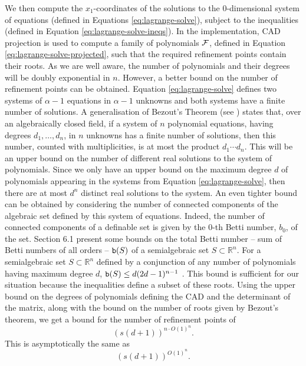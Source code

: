 \documentclass[
]{book}
\theoremstyle{definition}
\theoremstyle{definition}
\theoremstyle{definition}
\theoremstyle{definition}
\theoremstyle{remark}
\begin{document}
We then compute the \(x_1\)-coordinates of the solutions to the \(0\)-dimensional system of equations (defined in Equations \eqref{eq:lagrange-solve}), subject to the inequalities (defined in Equation \eqref{eq:lagrange-solve-ineqs}). In the implementation, CAD projection is used to compute a family of polynomials \({\cal F}\), defined in Equation \eqref{eq:lagrange-solve-projected}, such that the required refinement points contain their roots.
As we are well aware, the number of polynomials and their degrees will be doubly exponential in \(n\). However, a better bound on the number of refinement points can be obtained.
Equation \eqref{eq:lagrange-solve} defines two systems of \(\alpha - 1\) equations in \(\alpha - 1\) unknowns and both systems have a finite number of solutions.
A generalisation of Bezout's Theorem (see \citet{masser1983}) states that, over an algebraically closed field, if a system of \(n\) polynomial equations, having degrees \(d_1,\ldots,d_n\), in \(n\) unknowns has a finite number of solutions, then this number, counted with multiplicities, is at most the product \(d_1 \cdots d_n\). This will be an upper bound on the number of different real solutions to the system of polynomials. Since we only have an upper bound on the maximum degree \(d\) of polynomials appearing in the systems from Equation \eqref{eq:lagrange-solve}, then there are at most \(d^n\) distinct real solutions to the system.
An even tighter bound can be obtained by considering the number of connected components of the algebraic set defined by this system of equations.
Indeed, the number of connected components of a definable set is given by the \(0\)-th Betti number, \(b_0\), of the set.
\citet{gv2009} Section 6.1 present some bounds on the total Betti number -- sum of Betti numbers of all orders -- \({\tt{b}}(S)\) of a semialgebraic set \(S \subset \mathbb{R}^n\).
For a semialgebraic set \(S \subset \mathbb{R}^n\) defined by a conjunction of any number of polynomials having maximum degree \(d\), \({\tt{b}}(S) \le d(2d - 1)^{n-1}\) \citep[Section 6.1 (a)]{gv2009}.
This bound is sufficient for our situation because the inequalities define a subset of these roots.
Using the upper bound on the degrees of polynomials defining the CAD and the determinant of the matrix, along with the bound on the number of roots given by Bezout's theorem, we get a bound for the number of refinement points of
\[
\left(s(d+1)\right)^{n \cdot O(1)^{n}}.
\]
This is asymptotically the same as
\[
(s(d+1))^{O(1)^{n}}.
\]
\end{document}
